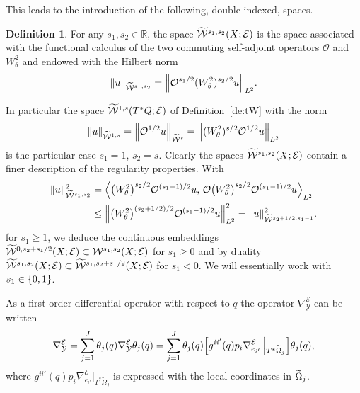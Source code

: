 \documentclass[10pt]{amsart}
\theoremstyle{definition}\newtheorem{defi}[theo]{Definition}\newtheorem{rema}[theo]{Remark}\newtheorem{exam}[theo]{Example}\newtheorem{exem}[theo]{Example}\newtheorem{nota}[theo]{Notation}
\newcommand{\R}{\mathbb{R}}
\newcommand{\clW}{\mathcal{W}}
\newcommand{\clY}{\mathcal{Y}}
\newcommand{\clO}{\mathcal{O}}
\newcommand{\clE}{\mathcal{E}}
\let\oldtilde\tilde
\renewcommand*{\tilde}[1]{\mathchoice{\widetilde{#1}}{\widetilde{#1}}{\oldtilde{#1}}{\oldtilde{#1}}}
\let\originalleft\left
\let\originalright\right
\renewcommand{\left}{\mathopen{}\mathclose\bgroup\originalleft}
\renewcommand{\right}{\aftergroup\egroup\originalright}
\begin{document}
This leads to the introduction of the following, double indexed, spaces.

\begin{defi}\label{de:Ws1s2}
For any $s_{1},s_{2}\in \R$, the space $\tilde{\clW}^{s_{1},s_{2}}(X;\clE)$ is the space associated with the functional calculus of the two commuting self-adjoint operators $\clO$ and $W^{2}_{\theta}$ and endowed with the Hilbert norm
\[
\|u\|_{\widetilde{\clW}^{s_{1},s_{2}}}=
\left\|\clO^{s_{1}/2}(W^{2}_{\theta})^{s_{2}/2}u\right\|_{L^{2}}.
\]
\end{defi}

In particular the space $\tilde{\clW}^{1,s}(T^{*}Q;\clE)$ of Definition~\ref{de:tW} with the norm
\[
\|u\|_{\widetilde{\clW}^{1,s}}=\left\|\clO^{1/2}u\right\|_{\widetilde{\clW}^{s}}=\left\|(W^{2}_{\theta})^{s/2}\clO^{1/2}u\right\|_{L^{2}}
\]
is the particular case $s_{1}=1$, $s_{2}=s$. Clearly the spaces $\tilde{\clW}^{s_{1},s_{2}}(X;\clE)$ contain a finer description of the regularity properties. With
\begin{align*}
\|u\|_{\widetilde{\clW}^{s_{1},s_{2}}}^{2} &=\left\langle \left(W^{2}_{\theta}\right)^{s_{2}/2}\clO^{(s_{1}-1)/2}u,\, \clO\left(W^{2}_{\theta}\right)^{s_{2}/2}\clO^{(s_{1}-1)/2}u\right\rangle_{L^{2}}\\
&\leq \left\|\left(W^{2}_{\theta}\right)^{(s_{2}+1/2)/2}\clO^{(s_{1}-1)/2}u\right\|_{L^{2}}^{2}=\|u\|_{\widetilde{\clW}^{s_{2}+1/2,s_{1}-1}}^{2}.
\end{align*}
for $s_{1}\geq 1$, we deduce the continuous embeddings $\tilde{\clW}^{0,s_{2}+s_{1}/2}(X;\clE)\subset \clW^{s_{1},s_{2}}(X;\clE)$ for $s_{1}\geq 0$ and by duality $\tilde{\clW}^{s_{1},s_{2}}(X;\clE)\subset \tilde{\clW}^{s_{1},s_{2}+s_{1}/2}(X;\clE)$ for $s_{1}<0$. We will essentially work with $s_{1}\in \left\{0,1\right\}$.

As a first order differential operator with respect to $q$ the operator $\nabla_{\clY}^{\clE}$ can be written
\[
\nabla_{\clY}^{\clE}=\sum_{j=1}^{J}\theta_{j}(q)\nabla_{\clY}^{\clE}\theta_{j}(q)=\sum_{j=1}^{J}\theta_{j}(q)\left[g^{ii'}(q)p_{i}\nabla_{e_{i'}}^{\clE}\,\middle|_{T^{*}\widetilde{\Omega}_{j}}\right]\theta_{j}(q),
\]
where $g^{ii'}(q)p_{i}\nabla_{e_{i'}}^{\clE}|_{T^{*}\widetilde{\Omega}_{j}}$ is expressed with the local coordinates in $\tilde{\Omega}_{j}$.
\end{document}
